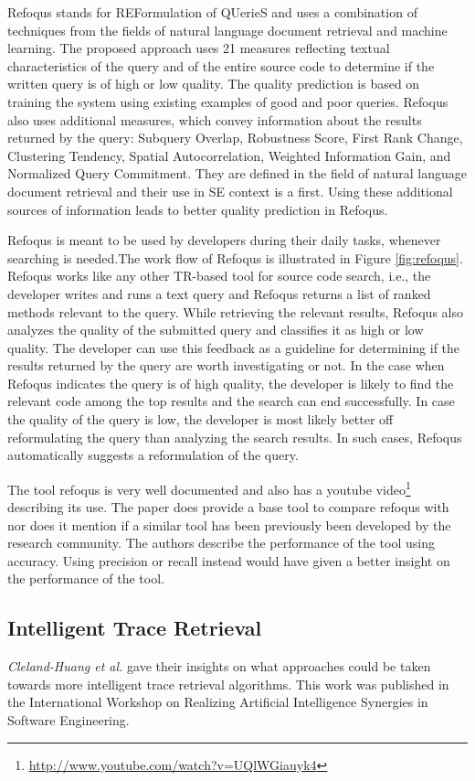 \documentclass{report}
\begin{document}
Refoqus stands for REFormulation of QUerieS and uses a combination of techniques from the fields of
natural language document retrieval and machine learning. The proposed approach uses 21 measures
reflecting textual characteristics of the query and of the entire source code to determine if the written
query is of high or low quality. The quality prediction is based on training the system using existing
examples of good and poor queries. Refoqus also uses additional measures, which convey information about
the results returned by the query: Subquery Overlap, Robustness Score, First Rank Change, Clustering
Tendency, Spatial Autocorrelation, Weighted Information Gain, and Normalized Query Commitment. They are
defined in the field of natural language document retrieval and their use in SE context is a first. Using
these additional sources of information leads to better quality prediction in Refoqus.

Refoqus is meant to be used by developers during their daily tasks, whenever searching is needed.The work
flow of Refoqus is illustrated in Figure \ref{fig:refoqus}. Refoqus works like any other TR-based tool for
source code search, i.e., the developer writes and runs a text query and Refoqus returns a list of ranked
methods relevant to the query. While retrieving the relevant results, Refoqus also analyzes the quality of
the submitted query and classifies it as high or low quality. The developer can use this feedback as a
guideline for determining if the results returned by the query are worth investigating or not. In the case
when Refoqus indicates the query is of high quality, the developer is likely to find the relevant code
among the top results and the search can end successfully. In case the quality of the query is low, the
developer is most likely better off reformulating the query than analyzing the search results. In such
cases, Refoqus automatically suggests a reformulation of the query.

The tool refoqus is very well documented and also has a youtube
video\footnote{\url{http://www.youtube.com/watch?v=UQlWGiauyk4}} describing its use. The paper does provide a
base tool to compare refoqus with nor does it mention if a similar tool has been previously been 
developed by the research community. The authors describe the performance of the tool using accuracy. 
Using precision or recall instead would have given a better insight on the performance of the tool.



\subsection{Intelligent Trace Retrieval}
\label{sec:intelligentTraces}
\textit{Cleland-Huang et al.} gave their insights on what approaches could be taken towards more 
intelligent trace retrieval algorithms\cite{clelandHuang14}. This work was published in the 
International Workshop on Realizing Artificial Intelligence Synergies in Software Engineering.
\end{document}
